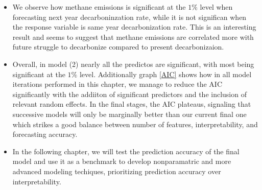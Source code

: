 \begin{itemize}
    \item We observe how methane emissions is significant at the $1\%$ level when forecasting next year decarboninzation rate, while it is not significan when the response variable is same year decarbonization rate. This is an interesting result and seems to suggest that methane emissions are correlated more with future struggle to decarbonize compared to present decarbonizaion. 
    \item Overall, in model (2) nearly all the predictos are significant, with most being significant at the $1\%$ level. Additionally graph \ref{AIC} shows how in all model iterations performed in this chapter, we manage to reduce the AIC significantly with the addiiton of significant predictors and the inclusion of relevant random effects. In the final stages, the AIC plateaus, signaling that successive models will only be marginally better than our current final one which strikes a good balance between number of features, interpretability, and forecasting accuracy.
    \item In the following chapter, we will test the prediction accuracy of the final model and use it as a benchmark to develop nonparamatric and more advanced modeling techiques, prioritizing prediction accuracy over interpretability.
\end{itemize}